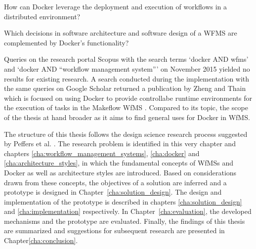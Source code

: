 \begin{description}[nosep]
  \item[RQ1:] How can Docker leverage the deployment and execution of workflows in a distributed environment?
  \item[RQ2:] Which decisions in software architecture and software design of a WFMS are complemented by Docker's functionality?
\end{description}

Queries on the research portal Scopus with the search terms `docker AND wfms' and `docker AND ``workflow management system''' on November  2015 yielded no results for existing research. A search conducted during the implementation with the same queries on Google Scholar returned a publication by Zheng and Thain which is focused on using Docker to provide controllabe runtime environments for the execution of tasks in the Makeflow \ac{WfMS} \cite{Zheng2015Integrating}. Compared to its topic, the scope of the thesis at hand broader as it aims to find general uses for Docker in \ac{WfMS}.

The structure of this thesis follows the design science research process suggested by Peffers et al. \cite[pp.~89-92]{Peffers2007Design}. The research problem is identified in this very chapter and chapters \ref{cha:workflow_management_systems}, \ref{cha:docker} and \ref{cha:architecture_styles}, in which the fundamental concepts of \acp{WfMS} and Docker as well as architecture styles are introduced.
Based on considerations drawn from these concepts, the objectives of a solution are inferred and a prototype is designed in Chapter~\ref{cha:solution_design}. The design and implementation of the prototype is described in chapters \ref{cha:solution_design} and \ref{cha:implementation} respectively. In Chapter~\ref{cha:evaluation}, the developed mechanisms and the prototype are evaluated. Finally, the findings of this thesis are summarized and suggestions for subsequent research are presented in Chapter\ref{cha:conclusion}.
